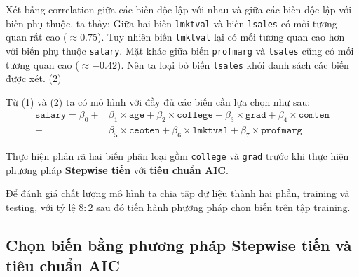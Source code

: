 Xét bảng correlation giữa các biến độc lập với nhau và giữa các biến độc lập với biến phụ thuộc, ta thấy: Giữa hai biến \texttt{lmktval} và biến \texttt{lsales} có mối tương quan rất cao ($\approx 0.75$). Tuy nhiên biến \texttt{lmktval} lại có mối tương quan cao hơn với biến phụ thuộc \texttt{salary}. Mặt khác giữa biến \texttt{profmarg} và \texttt{lsales} cũng có mối tương quan cao ($\approx -0.42$). Nên ta loại bỏ biến \texttt{lsales} khỏi danh sách các biến được xét. (2)

Từ (1) và (2) ta có mô hình với đầy đủ các biến cần lựa chọn như sau:
\begin{equation}\label{eq-b1:full-model}
	\begin{split}
		\texttt{salary} 	= \beta_0 + &\beta_1 \times \texttt{age} + \beta_2 \times \texttt{college} + \beta_3 \times \texttt{grad} + \beta_4 \times \texttt{comten}\\
		+ &\beta_5\times \texttt{ceoten} + \beta_6\times \texttt{lmktval} + \beta_7\times \texttt{profmarg}
	\end{split}
\end{equation}


Thực hiện phân rã hai biến phân loại gồm \texttt{college} và \texttt{grad} trước khi thực hiện phương pháp  \textbf{Stepwise tiến} với \textbf{tiêu chuẩn AIC}.

Để đánh giá chất lượng mô hình ta chia tâp dữ liệu thành hai phần, training và testing, với tỷ lệ $8:2$ sau đó tiến hành phương pháp chọn biến trên tập training.

\subsection*{Chọn biến bằng phương pháp Stepwise tiến và tiêu chuẩn AIC}

